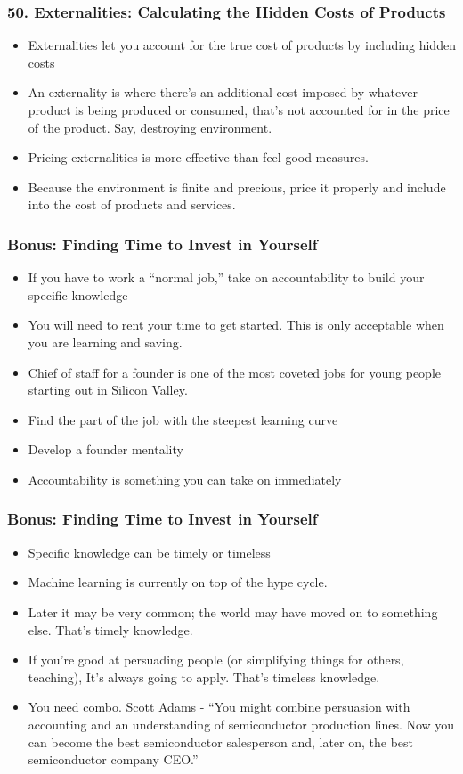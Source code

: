 \begin{frame}[fragile]
\frametitle{50. Externalities: Calculating the Hidden Costs of Products}
\begin{itemize}
\item Externalities let you account for the true cost of products by including hidden costs
\item  An externality is where there’s an additional cost imposed by whatever product is being produced
or consumed, that’s not accounted for in the price of the product. Say, destroying environment.
\item Pricing externalities is more effective than feel-good measures. 
\item Because the environment is  finite and precious, price it properly and include into the
cost of products and services.
\end{itemize}
\end{frame}


\begin{frame}[fragile]
\frametitle{Bonus: Finding Time to Invest in Yourself}
\begin{itemize}
\item If you have to work a “normal job,” take on accountability to build your specific knowledge
\item You will need to rent your time to get started.
This is only acceptable when you are learning and saving.
\item Chief of staff  for a founder is one of the most coveted jobs for young people starting out in Silicon Valley.
\item Find the part of the job with the steepest learning curve
\item Develop a founder mentality
\item Accountability is something you can take on immediately
\end{itemize}
\end{frame}

\begin{frame}[fragile]
\frametitle{Bonus: Finding Time to Invest in Yourself}
\begin{itemize}
\item Specific knowledge can be timely or timeless
\item Machine learning is currently on top of the hype cycle. 
\item Later it may be very common; the world may have moved on to something else. That’s timely knowledge.
\item If you’re good at persuading people (or simplifying things for others, teaching), It’s always going to apply. That’s timeless knowledge.
\item You need combo. Scott Adams - ``You might combine persuasion with accounting and an
understanding of semiconductor production lines. Now you can become the best semiconductor salesperson and, later on, the best semiconductor company CEO.''
\end{itemize}
\end{frame}


